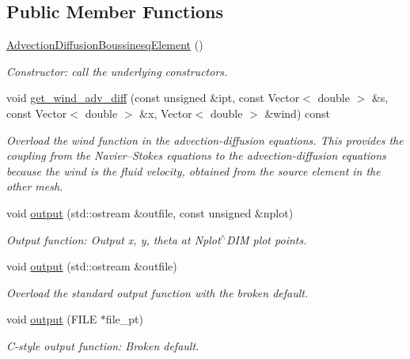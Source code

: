 \subsection*{Public Member Functions}
\begin{DoxyCompactItemize}
\item 
\hyperlink{classoomph_1_1AdvectionDiffusionBoussinesqElement_a733c18518938e3b85e06de5a618cd49f}{Advection\+Diffusion\+Boussinesq\+Element} ()
\begin{DoxyCompactList}\small\item\em Constructor\+: call the underlying constructors. \end{DoxyCompactList}\item 
void \hyperlink{classoomph_1_1AdvectionDiffusionBoussinesqElement_a86ec5858acc0a562cee7bccedfecb252}{get\+\_\+wind\+\_\+adv\+\_\+diff} (const unsigned \&ipt, const Vector$<$ double $>$ \&s, const Vector$<$ double $>$ \&x, Vector$<$ double $>$ \&wind) const
\begin{DoxyCompactList}\small\item\em Overload the wind function in the advection-\/diffusion equations. This provides the coupling from the Navier--Stokes equations to the advection-\/diffusion equations because the wind is the fluid velocity, obtained from the source element in the other mesh. \end{DoxyCompactList}\item 
void \hyperlink{classoomph_1_1AdvectionDiffusionBoussinesqElement_afcb2b136650ecca8fd47eb4278616d29}{output} (std\+::ostream \&outfile, const unsigned \&nplot)
\begin{DoxyCompactList}\small\item\em Output function\+: Output x, y, theta at Nplot$^\wedge$\+D\+IM plot points. \end{DoxyCompactList}\item 
void \hyperlink{classoomph_1_1AdvectionDiffusionBoussinesqElement_acc615c265bef2c3f5c30c6be95c0f50d}{output} (std\+::ostream \&outfile)
\begin{DoxyCompactList}\small\item\em Overload the standard output function with the broken default. \end{DoxyCompactList}\item 
void \hyperlink{classoomph_1_1AdvectionDiffusionBoussinesqElement_adbd60fca6201bc2cd80ff39303323053}{output} (F\+I\+LE $\ast$file\+\_\+pt)
\begin{DoxyCompactList}\small\item\em C-\/style output function\+: Broken default. \end{DoxyCompactList}\item 

\end{DoxyCompactItemize}
